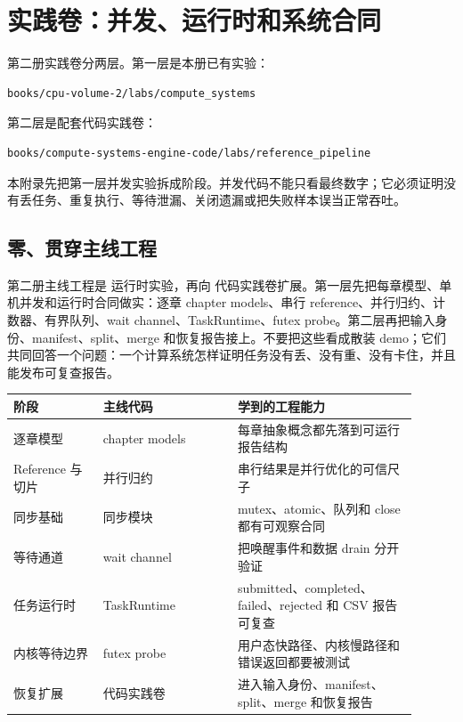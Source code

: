 \chapter{实践卷：并发、运行时和系统合同}

第二册实践卷分两层。第一层是本册已有实验：

\begin{lstlisting}[language=bash]
books/cpu-volume-2/labs/compute_systems
\end{lstlisting}

第二层是配套代码实践卷：

\begin{lstlisting}[language=bash]
books/compute-systems-engine-code/labs/reference_pipeline
\end{lstlisting}

本附录先把第一层并发实验拆成阶段。并发代码不能只看最终数字；它必须证明没有丢任务、重复执行、等待泄漏、关闭遗漏或把失败样本误当正常吞吐。

\section{零、贯穿主线工程}

第二册主线工程是  运行时实验，再向  代码实践卷扩展。第一层先把每章模型、单机并发和运行时合同做实：逐章 chapter models、串行 reference、并行归约、计数器、有界队列、wait channel、TaskRuntime、futex probe。第二层再把输入身份、manifest、split、merge 和恢复报告接上。不要把这些看成散装 demo；它们共同回答一个问题：一个计算系统怎样证明任务没有丢、没有重、没有卡住，并且能发布可复查报告。

\begin{longtable}{p{0.20\linewidth}p{0.30\linewidth}p{0.40\linewidth}}
阶段 & 主线代码 & 学到的工程能力 \\
\hline
逐章模型 & chapter models & 每章抽象概念都先落到可运行报告结构 \\
Reference 与切片 & 并行归约 & 串行结果是并行优化的可信尺子 \\
同步基础 & 同步模块 & mutex、atomic、队列和 close 都有可观察合同 \\
等待通道 & wait channel & 把唤醒事件和数据 drain 分开验证 \\
任务运行时 & TaskRuntime & submitted、completed、failed、rejected 和 CSV 报告可复查 \\
内核等待边界 & futex probe & 用户态快路径、内核慢路径和错误返回都要被测试 \\
恢复扩展 & 代码实践卷 & 进入输入身份、manifest、split、merge 和恢复报告 \\
\end{longtable}


